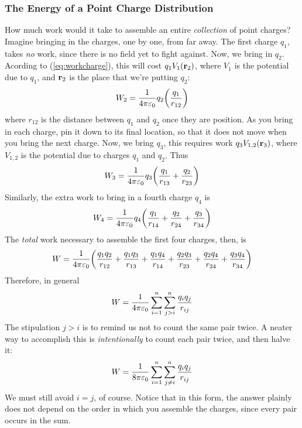 	\subsubsection{The Energy of a Point Charge Distribution}
		How much work would it take to assemble an entire \textit{collection} of point charges?
		Imagine bringing in the charges, one by one, from far away. The first charge $q_1$,
		takes \textit{no} work, since there is no field yet to fight against. Now, we bring
		in $q_2$. Acording to
		(\ref{eq:workcharge}),
		this will cost $q_1V_1(\vb{r}_2)$, where $V_1$ is the potential due to $q_1$, and
		$\vb{r}_2$ is the place that we're  putting $q_2$:
		\[
			W_2
			=
			\frac{1}{4\pi\epsz}
			q_2\pqty{
				\frac{q_1}{r_{12}} 
			}
		\]
		where $r_{12}$ is the distance between $q_1$ and $q_2$ once they are position. As 
		you bring in each charge, pin it down to its final location, so that it does not move
		when you bring the next charge. Now, we bring $q_3$, this requires work $q_3 V_{1,2}(\vb{r}_3)$,
		where $V_{1,2}$ is the potential due to charges $q_1$ and $q_2$. Thus
		\[
			W_3 = 
			\frac{1}{4\pi\epsz}
			q_3\pqty{
				\frac{q_1}{r_{13}} 
				+
				\frac{q_2}{r_{23}} 
			}
		\]
		Similarly, the extra work to bring in a fourth charge $q_4$ is
		\[
			W_4 = 
			\frac{1}{4\pi\epsz}
			q_4\pqty{
				\frac{q_1}{r_{14}} 
				+
				\frac{q_2}{r_{24}} 
				+
				\frac{q_3}{r_{34}} 
			}
		\]
		The \textit{total} work necessary to assemble the first four charges, then, is
		\[
			W 
			=
			\frac{1}{4\pi\epsz}
			\pqty{
				\frac{q_1 q_2}{r_{12}} +
				\frac{q_1 q_3}{r_{13}} +
				\frac{q_1 q_4}{r_{14}} +
				\frac{q_2 q_3}{r_{23}} +
				\frac{q_2 q_4}{r_{24}} +
				\frac{q_3 q_4}{r_{34}}
			}
		\]
		Therefore, in general
		\begin{equation}
		    W = 
			\frac{1}{4\pi\varepsilon_0}
			\sum_{i=1}^{n}
			\sum_{j>i}^{n}
			\frac{q_i q_j}{r_{ij}} 
		\end{equation}
		The stipulation $j>i$ is to remind us not to count the same pair twice. A neater
		way to accomplish this is \textit{intentionally} to count each pair twice, and then
		halve it:
		\begin{equation}
		    W = 
			\frac{1}{8\pi\varepsilon_0}
			\sum_{i=1}^{n}
			\sum_{j\neq i}^{n}
			\frac{q_i q_j}{r_{ij}} 
		\end{equation}
		We must still avoid $i=j$, of course. Notice that in this form, the answer plainly
		does not depend on the order in which you assemble the charges, since every pair occurs
		in the sum.

